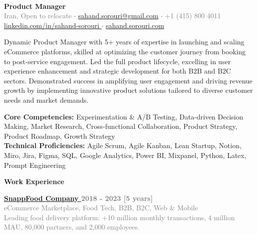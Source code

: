 \documentclass[a4paper,10.9pt]{article}
\newcommand{\sectiontitle}[1]{
  \begin{tcolorbox}[colback=black, colupper=white, sharp corners, boxrule=0pt, boxsep=3pt, left=0pt, right=0pt, top=1pt, bottom=1pt]
    \Large\bfseries #1
  \end{tcolorbox}
}
\newcommand{\majorposition}[1]{{\hspace{0pt}\Large\bfseries #1}\vspace{0.2em}}
\newcommand{\graytext}[1]{\textcolor{grey}{#1}} %
\newcommand{\boxedtext}[1]{\begin{mybox}#1\end{mybox}}
\begin{document}
\thispagestyle{empty}
\begin{center}
\\
\vspace{7pt}
{\textbf{\LARGE{Product Manager}}}\\
\normalsize
\graytext{Iran, Open to relocate} $\cdot$ \href{mailto:sahand.sorouri@gmail.com}{sahand.sorouri@gmail.com} $\cdot$ \graytext{+1 (415) 800 4011}
\\
\href{https://linkedin.com/in/sahand-sorouri}{linkedin.com/in/sahand-sorouri \faExternalLink{}} $\cdot$ \href{https://sahand.sorouri.com}{sahand.sorouri.com \faExternalLink{}}
\end{center}
{Dynamic Product Manager with 5+ years of expertise in launching and scaling eCommerce platforms, skilled at optimizing the customer journey from booking to post-service engagement. Led the full product lifecycle, excelling in user experience enhancement and strategic development for both B2B and B2C sectors. Demonstrated success in amplifying user engagement and driving revenue growth by implementing innovative product solutions tailored to diverse customer needs and market demands.}
{\boxedtext{\textbf{Core Competencies: }Experimentation \& A/B Testing, Data-driven Decision Making, Market Research, Cross-functional Collaboration, Product Strategy, Product Roadmap, Growth Strategy\\
\textbf{Technical Proficiencies:} Agile Scrum, Agile Kanban, Lean Startup, Notion, Miro, Jira, Figma, SQL, Google Analytics, Power BI, Mixpanel, Python, Latex, Prompt Engineering}}
\sectiontitle{Work Experience}
{\majorposition{\href{https://snappfood.ir}{SnappFood Company \faExternalLink{}}} \hfill\Large{\textbf{\graytext{2018 - 2023 [5 years]}}}}\\
{\small{\graytext{eCommerce Marketplace, Food Tech, B2B, B2C, Web \& Mobile}}\\
\small\graytext{Leading food delivery platform: +10 million monthly transactions, 4 million MAU, 80,000 partners, and 2,000 employees.}}
\vspace{5pt}
\end{document}
